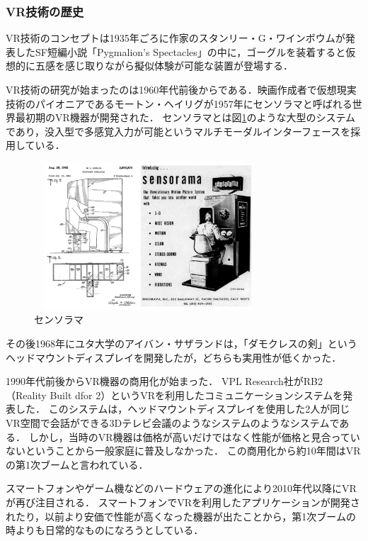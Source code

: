 \documentclass[12pt,a4j]{ltjsarticle}
\begin{document}
\subsubsection{VR技術の歴史}
VR技術のコンセプトは1935年ごろに作家のスタンリー・G・ワインボウムが発表したSF短編小説「Pygmalion’s Spectacles」の中に，ゴーグルを装着すると仮想的に五感を感じ取りながら擬似体験が可能な装置が登場する．

VR技術の研究が始まったのは1960年代前後からである．映画作成者で仮想現実技術のパイオニアであるモートン・ヘイリグが1957年にセンソラマと呼ばれる世界最初期のVR機器が開発された．
センソラマとは図\ref{fig:センソラマ.pdf}のような大型のシステムであり，没入型で多感覚入力が可能というマルチモーダルインターフェースを採用している．

\begin{figure}[h]
\begin{center}
 \includegraphics[clip,width=85mm,height=55mm]{センソラマ.pdf}
\end{center}
 \caption{センソラマ}
 \label{fig:センソラマ.pdf}
\end{figure}

その後1968年にユタ大学のアイバン・サザランドは，「ダモクレスの剣」というヘッドマウントディスプレイを開発したが，どちらも実用性が低くかった\cite{VRの概念の登場}．

1990年代前後からVR機器の商用化が始まった．
VPL Research社がRB2（Reality Built dfor 2）というVRを利用したコミュニケーションシステムを発表した．
このシステムは，ヘッドマウントディスプレイを使用した2人が同じVR空間で会話ができる3Dテレビ会議のようなシステムのようなシステムである．
しかし，当時のVR機器は価格が高いだけではなく性能が価格と見合っていないということから一般家庭に普及しなかった．
この商用化から約10年間はVRの第1次ブームと言われている\cite{VRの初の商用化}．

スマートフォンやゲーム機などのハードウェアの進化により2010年代以降にVRが再び注目される\cite{VRの概念の登場}．
スマートフォンでVRを利用したアプリケーションが開発されたり，以前より安価で性能が高くなった機器が出たことから，第1次ブームの時よりも日常的なものになろうとしている．
\end{document}
